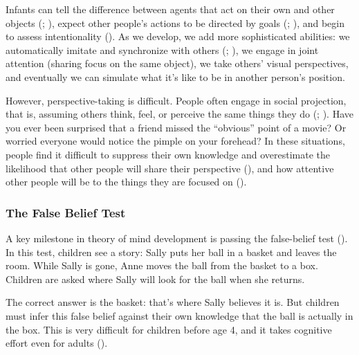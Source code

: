 \documentclass[
]{krantz}
\begin{document}
Infants can tell the difference between agents that act on their own and other objects (; ), expect other people's actions to be directed by goals (; ), and begin to assess intentionality (). As we develop, we add more sophisticated abilities: we automatically imitate and synchronize with others (; ), we engage in joint attention (sharing focus on the same object), we take others' visual perspectives, and eventually we can simulate what it's like to be in another person's position.

However, perspective-taking is difficult. People often engage in social projection, that is, assuming others think, feel, or perceive the same things they do (; ). Have you ever been surprised that a friend missed the ``obvious'' point of a movie? Or worried everyone would notice the pimple on your forehead? In these situations, people find it difficult to suppress their own knowledge and overestimate the likelihood that other people will share their perspective (), and how attentive other people will be to the things they are focused on ().

\subsubsection*{The False Belief Test}\label{the-false-belief-test}


A key milestone in theory of mind development is passing the false-belief test (). In this test, children see a story: Sally puts her ball in a basket and leaves the room. While Sally is gone, Anne moves the ball from the basket to a box. Children are asked where Sally will look for the ball when she returns.

The correct answer is the basket: that's where Sally believes it is. But children must infer this false belief against their own knowledge that the ball is actually in the box. This is very difficult for children before age 4, and it takes cognitive effort even for adults ().
\end{document}
